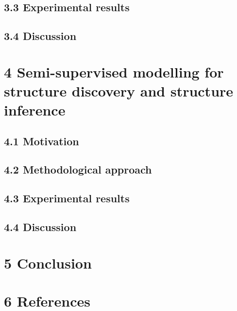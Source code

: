 \documentclass[authoryear,review,3p]{elsarticle}
\begin{document}
\subsection*{3.3 Experimental results}
\subsection*{3.4 Discussion}


\section*{4 Semi-supervised modelling for structure discovery
and structure inference}

\subsection*{4.1 Motivation}
\subsection*{4.2 Methodological approach}
\subsection*{4.3 Experimental results}
\subsection*{4.4 Discussion}



\section*{5 Conclusion}



\bigskip
\section*{6 References}



\end{document}
